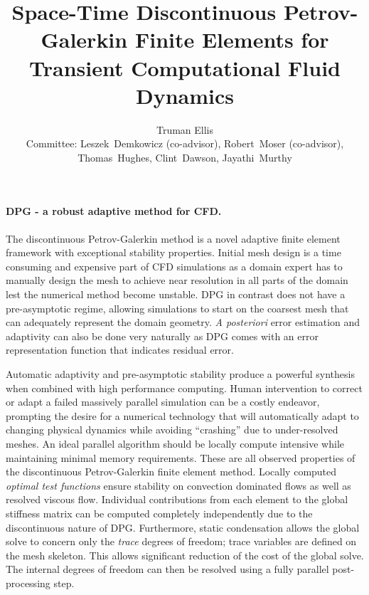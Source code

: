 \documentclass[letterpaper]{article}
\title{Space-Time Discontinuous Petrov-Galerkin Finite Elements for Transient Computational Fluid Dynamics}
\author{Truman Ellis\\
Committee: Leszek~Demkowicz (co-advisor), Robert~Moser (co-advisor), Thomas~Hughes, Clint~Dawson, Jayathi~Murthy}
\date{}
\begin{document}
\maketitle

\paragraph{DPG - a robust adaptive method for CFD.}
The discontinuous Petrov-Galerkin method\cite{DPGOverview} is a novel adaptive finite element framework with exceptional stability properties.
Initial mesh design is a time consuming and expensive part of CFD simulations as a domain expert has to manually design the 
mesh to achieve near resolution in all parts of the domain lest the numerical method become unstable.
DPG in contrast does not have a pre-asymptotic regime, allowing simulations to start on the coarsest mesh that can adequately represent the domain geometry.
\emph{A posteriori} error estimation and adaptivity can also be done very naturally as DPG comes with an error representation function 
that indicates residual error.

Automatic adaptivity and pre-asymptotic stability produce a powerful synthesis when combined with high performance computing.
Human intervention to correct or adapt a failed massively parallel simulation can be a costly endeavor, prompting the desire for a
numerical technology that will automatically adapt to changing physical dynamics while avoiding ``crashing'' due to under-resolved meshes.
An ideal parallel algorithm should be locally compute intensive while maintaining minimal memory requirements\cite{BlastWebPage}.
These are all observed properties of the discontinuous Petrov-Galerkin finite element method.
Locally computed \emph{optimal test functions} ensure stability on convection dominated flows as well as resolved viscous flow.
Individual contributions from each element to the global stiffness matrix can be computed completely independently due to the discontinuous nature of DPG.
Furthermore, static condensation allows the global solve to concern only the \emph{trace} degrees of freedom; 
trace variables are defined on the mesh skeleton.  
This allows significant reduction of the cost of the global solve.  
The internal degrees of freedom can then be resolved using a fully parallel post-processing step.
\end{document}
